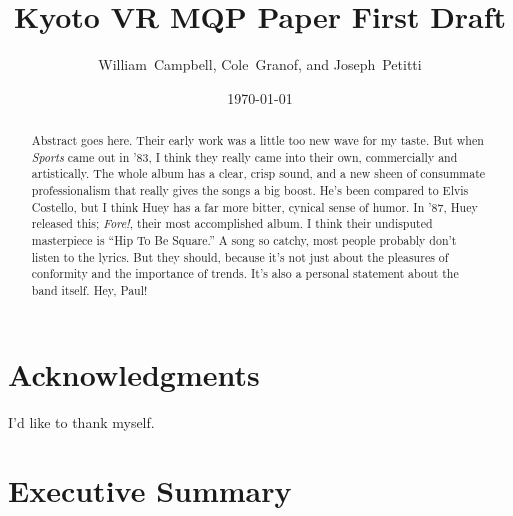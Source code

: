 \documentclass[a4paper, 10pt, american, titlepage]{article}
\title{Kyoto VR MQP Paper First Draft}
\author{William~Campbell, Cole~Granof, and Joseph~Petitti}
\date{\today}
\begin{document}


\maketitle

\begin{abstract}
Abstract goes here. Their early work was a little too new wave for my taste.
But when \textit{Sports} came out in '83, I think they really came into their
own, commercially and artistically. The whole album has a clear, crisp sound,
and a new sheen of consummate professionalism that really gives the songs a
big boost.  He's been compared to Elvis Costello, but I think Huey has a far
more bitter, cynical sense of humor. In '87, Huey released this;
\textit{Fore!}, their most accomplished album. I think their undisputed
masterpiece is ``Hip To Be Square.'' A song so catchy, most people probably
don't listen to the lyrics. But they should, because it's not just about the
pleasures of conformity and the importance of trends. It's also a personal
statement about the band itself. Hey, Paul!
\end{abstract}

\section*{Acknowledgments}
\label{sec:acknowledgements}

I'd like to thank myself. \lipsum[1]

\clearpage

\section*{Executive Summary}
\label{sec:executiveSummary}

\lipsum[1-2]

\clearpage

{
\linespread{1}

\tableofcontents
\newpage

\listoffigures
\newpage

}
\end{document}
